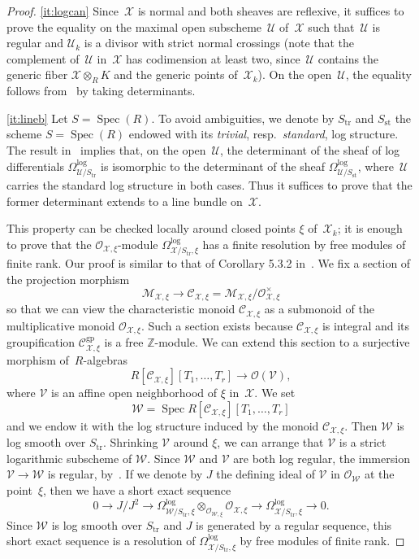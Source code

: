 \documentclass[JEP,XML,SOM,Unicode,NoFloatCountersInSection]{cedram}
\let\mathcal\mathscr
\theoremstyle{definition}
\numberwithin{equation}{subsection}
\newcommand{\Z}{\ensuremath{\mathbb{Z}}}
\newcommand{\cX}{\ensuremath{\mathscr{X}}}
\newcommand{\cU}{\ensuremath{\mathscr{U}}}
\newcommand{\cV}{\ensuremath{\mathscr{V}}}
\newcommand{\cW}{\ensuremath{\mathscr{W}}}
\newcommand{\gp}{\mathrm{gp}}
\newcommand{\st}{\mathrm{st}}
\newcommand{\tr}{\mathrm{tr}}
\DeclareMathOperator{\Spec}{Spec}
\begin{document}
\skpt
\begin{proof}
\eqref{it:logcan} Since~$\cX$ is normal and both sheaves are reflexive, it suffices to prove the equality on the maximal open subscheme~$\cU$ of~$\cX$ such that~$\cU$ is regular and $\cU_k$ is a divisor with strict normal crossings (note that the complement of~$\cU$ in~$\cX$ has codimension at least two, since~$\cU$ contains the generic fiber $\cX\otimes_R K$ and the generic points of~$\cX_k$). On the open~$\cU$, the equality follows from~\cite[5.3.4]{kato-saito} by taking determinants.

\eqref{it:lineb}
Let $S=\Spec(R)$.
To avoid ambiguities, we denote by $S_{\tr}$ and $S_{\st}$ the scheme $S=\Spec(R)$ endowed with its {\em trivial}, resp.~{\em standard}, log structure.
The result in~\cite[5.3.4]{kato-saito} implies that, on the open~$\cU$, the determinant of the sheaf of log differentials $\Omega^{\log}_{\cU/S_{\tr}}$ is isomorphic to the determinant of the sheaf $\Omega^{\log}_{\cU/S_{\st}}$, where~$\cU$ carries the standard log structure in both cases. Thus it suffices to prove that the former determinant extends to a line bundle on~$\cX$.

This property can be checked locally around closed points $\xi$ of~$\cX_k$;
it is enough to prove that the $\mathcal{O}_{\cX,\xi}$-module $\Omega^{\log}_{\cX/S_{\tr},\xi}$ has a finite resolution by free modules of finite rank. Our proof is similar to that of Corollary 5.3.2 in~\cite{kato-saito}.
We fix a section of the projection morphism
\[
\mathcal{M}_{\cX,\xi}\to \mathcal{C}_{\cX,\xi}=\mathcal{M}_{\cX,\xi}/\mathcal{O}^{\times}_{\cX,\xi}
\]
so that we can view the characteristic monoid $\mathcal{C}_{\cX,\xi}$ as a submonoid of the multiplicative monoid $\mathcal{O}_{\cX,\xi}$. Such a section exists because $\mathcal{C}_{\cX,\xi}$ is integral and its groupification $\mathcal{C}^{\gp}_{\cX,\xi}$ is a free $\Z$-module. We can extend this section to a surjective morphism of~$R$\nobreakdash-algebras
\[
R[\mathcal{C}_{\cX,\xi}][T_1,\ldots,T_r]\to \mathcal{O}(\cV),
\]
where $\cV$ is an affine open neighborhood of $\xi$ in~$\cX$.
We set
\[
\cW=\Spec R[\mathcal{C}_{\cX,\xi}][T_1,\ldots,T_r]
\]
and we endow it with the log structure induced by the monoid $\mathcal{C}_{\cX,\xi}$.
Then $\cW$ is log smooth over $S_{\tr}$. Shrinking $\cV$ around $\xi$, we can arrange that $\cV$ is a strict logarithmic subscheme of $\cW$.
Since $\cW$ and $\cV$ are both log regular, the immersion $\cV\to \cW$ is regular, by~\cite[4.2]{kato}. If we denote by $J$ the defining ideal of $\cV$ in $\mathcal{O}_{\cW}$ at the point~$\xi$, then we have a short exact sequence
\begin{equation}\label{eq:res}
0\to J/J^2 \to \Omega^{\log}_{\cW/S_{\tr},\xi}\otimes_{\mathcal{O}_{\cW,\xi} } \mathcal{O}_{\cX,\xi}\to \Omega^{\log}_{\cX/S_{\tr},\xi} \to 0.
\end{equation}
Since $\cW$ is log smooth over $S_{\tr}$ and $J$ is generated by a regular sequence, this short exact sequence is a resolution of $\Omega^{\log}_{\cX/S_{\tr},\xi}$ by free modules of finite rank.


\end{proof}
\end{document}
